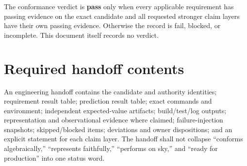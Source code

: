 \documentclass[10pt]{article}
\begin{document}
The conformance verdict is \textbf{pass} only when every applicable requirement
has passing evidence on the exact candidate and all requested stronger claim
layers have their own passing evidence. Otherwise the record is fail, blocked,
or incomplete. This document itself records no verdict.

\section{Required handoff contents}

An engineering handoff contains the candidate and authority identities;
requirement result table; prediction result table; exact commands and
environment; independent expected-value artifacts; build/test/log outputs;
representation and observational evidence where claimed; failure-injection
snapshots; skipped/blocked items; deviations and owner dispositions; and an
explicit statement for each claim layer. The handoff shall not collapse
``conforms algebraically,'' ``represents faithfully,'' ``performs on sky,'' and
``ready for production'' into one status word.
\end{document}
